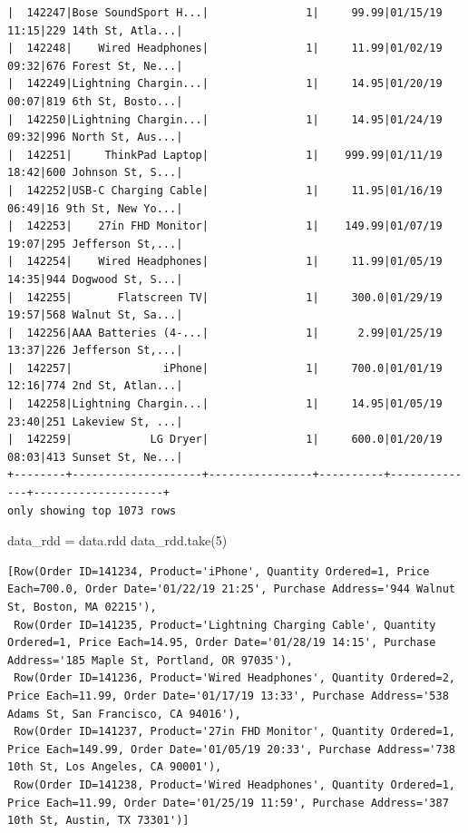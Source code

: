 \documentclass[
  letterpaper,
  DIV=11,
  numbers=noendperiod]{scrartcl}
\newenvironment{Shaded}{\begin{snugshade}}{\end{snugshade}}
\newcommand{\DecValTok}[1]{\textcolor[rgb]{0.68,0.00,0.00}{#1}}
\newcommand{\NormalTok}[1]{\textcolor[rgb]{0.00,0.23,0.31}{#1}}
\newcommand{\OperatorTok}[1]{\textcolor[rgb]{0.37,0.37,0.37}{#1}}
\begin{document}
\begin{verbatim}
|  142247|Bose SoundSport H...|               1|     99.99|01/15/19 11:15|229 14th St, Atla...|
|  142248|    Wired Headphones|               1|     11.99|01/02/19 09:32|676 Forest St, Ne...|
|  142249|Lightning Chargin...|               1|     14.95|01/20/19 00:07|819 6th St, Bosto...|
|  142250|Lightning Chargin...|               1|     14.95|01/24/19 09:32|996 North St, Aus...|
|  142251|     ThinkPad Laptop|               1|    999.99|01/11/19 18:42|600 Johnson St, S...|
|  142252|USB-C Charging Cable|               1|     11.95|01/16/19 06:49|16 9th St, New Yo...|
|  142253|    27in FHD Monitor|               1|    149.99|01/07/19 19:07|295 Jefferson St,...|
|  142254|    Wired Headphones|               1|     11.99|01/05/19 14:35|944 Dogwood St, S...|
|  142255|       Flatscreen TV|               1|     300.0|01/29/19 19:57|568 Walnut St, Sa...|
|  142256|AAA Batteries (4-...|               1|      2.99|01/25/19 13:37|226 Jefferson St,...|
|  142257|              iPhone|               1|     700.0|01/01/19 12:16|774 2nd St, Atlan...|
|  142258|Lightning Chargin...|               1|     14.95|01/05/19 23:40|251 Lakeview St, ...|
|  142259|            LG Dryer|               1|     600.0|01/20/19 08:03|413 Sunset St, Ne...|
+--------+--------------------+----------------+----------+--------------+--------------------+
only showing top 1073 rows
\end{verbatim}

\begin{Shaded}
\begin{Highlighting}[]
\NormalTok{data\_rdd }\OperatorTok{=}\NormalTok{ data.rdd}
\NormalTok{data\_rdd.take(}\DecValTok{5}\NormalTok{)}
\end{Highlighting}
\end{Shaded}

\begin{verbatim}
[Row(Order ID=141234, Product='iPhone', Quantity Ordered=1, Price Each=700.0, Order Date='01/22/19 21:25', Purchase Address='944 Walnut St, Boston, MA 02215'),
 Row(Order ID=141235, Product='Lightning Charging Cable', Quantity Ordered=1, Price Each=14.95, Order Date='01/28/19 14:15', Purchase Address='185 Maple St, Portland, OR 97035'),
 Row(Order ID=141236, Product='Wired Headphones', Quantity Ordered=2, Price Each=11.99, Order Date='01/17/19 13:33', Purchase Address='538 Adams St, San Francisco, CA 94016'),
 Row(Order ID=141237, Product='27in FHD Monitor', Quantity Ordered=1, Price Each=149.99, Order Date='01/05/19 20:33', Purchase Address='738 10th St, Los Angeles, CA 90001'),
 Row(Order ID=141238, Product='Wired Headphones', Quantity Ordered=1, Price Each=11.99, Order Date='01/25/19 11:59', Purchase Address='387 10th St, Austin, TX 73301')]
\end{verbatim}
\end{document}
